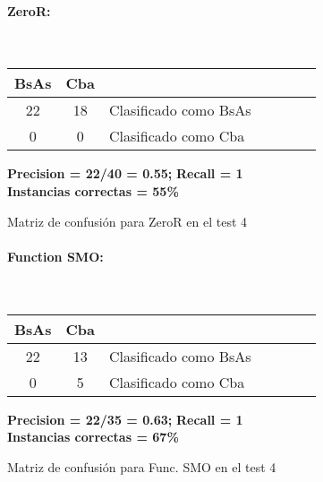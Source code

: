 \begin{figure}[H]
\centering
\paragraph*{ZeroR:}\mbox{}\\
\begin{table}[H]
\centering
\begin{tabular}{|c|c|l|c|c|c|c|}
\hline
 BsAs & Cba &  \\ \hline
 22 &  18 &  Clasificado como BsAs \\ \hline
 0  &   0 &  Clasificado como Cba \\ \hline
\end{tabular}
\end{table}
\begin{center}
\textbf{Precision = 22/40 = 0.55;} \textbf{Recall = 1}\\
\textbf{Instancias correctas = 55\%}
\end{center}
\caption{Matriz de confusión para ZeroR en el test 4}
\label{ZeroR_matrizconf}
\end{figure}

\begin{figure}[H]
\centering
\paragraph*{Function SMO:}\mbox{}\\
\begin{table}[H]
\centering
\begin{tabular}{|c|c|l|c|c|c|c|}
\hline
 BsAs & Cba &  \\ \hline
 22 &  13 &  Clasificado como BsAs \\ \hline
 0  &   5 &  Clasificado como Cba \\ \hline
\end{tabular}
\end{table}
\begin{center}
\textbf{Precision = 22/35 = 0.63;} \textbf{Recall = 1}\\
\textbf{Instancias correctas = 67\%}
\end{center}
\caption{Matriz de confusión para Func. SMO en el test 4}
\label{FSMO_matrizconf}
\end{figure}

